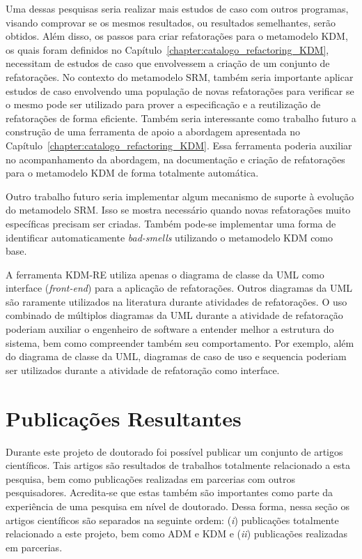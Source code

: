 Uma dessas pesquisas seria realizar mais estudos de caso com outros programas, visando comprovar se os mesmos resultados, ou resultados semelhantes, serão obtidos. Além disso, os passos para criar refatorações para o metamodelo KDM, os quais foram definidos no Capítulo~\ref{chapter:catalogo_refactoring_KDM}, necessitam de estudos de caso que envolvessem a criação de um conjunto de refatorações. No contexto do metamodelo SRM, também seria importante aplicar estudos de caso envolvendo uma população de novas refatorações para verificar se o mesmo pode ser utilizado para prover a especificação e a reutilização de refatorações de forma eficiente. Também seria interessante como trabalho futuro a construção de uma ferramenta de apoio a abordagem apresentada no Capítulo~\ref{chapter:catalogo_refactoring_KDM}. Essa ferramenta poderia auxiliar no acompanhamento da abordagem, na documentação e criação de refatorações para o metamodelo KDM de forma totalmente automática.

Outro trabalho futuro seria implementar algum mecanismo de suporte à evolução do metamodelo SRM. Isso se mostra necessário quando novas refatorações muito específicas precisam ser criadas. Também pode-se implementar uma forma de identificar automaticamente \textit{bad-smells} utilizando o metamodelo KDM como base. %


A ferramenta KDM-RE utiliza apenas o diagrama de classe da UML como interface (\textit{front-end}) para a aplicação de refatorações. Outros diagramas da UML são raramente utilizados na literatura durante atividades de refatorações. O uso combinado de múltiplos diagramas da UML durante a atividade de refatoração poderiam auxiliar o engenheiro de software a entender melhor a estrutura do sistema, bem como compreender também seu comportamento. Por exemplo, além do diagrama de classe da UML, diagramas de caso de uso e sequencia poderiam ser utilizados durante a atividade de refatoração como interface.


\section{Publicações Resultantes}\label{sec:publicacoes_resultantes}
Durante este projeto de doutorado foi possível publicar um conjunto de artigos científicos. Tais artigos são resultados de trabalhos totalmente relacionado a esta pesquisa, bem como publicações realizadas em parcerias com outros pesquisadores. Acredita-se que estas também são importantes como parte da experiência de uma pesquisa em nível de doutorado. Dessa forma, nessa seção os artigos científicos são separados na seguinte ordem: (\textit{i}) publicações totalmente relacionado a este projeto, bem como ADM e KDM e (\textit{ii}) publicações realizadas em parcerias.

